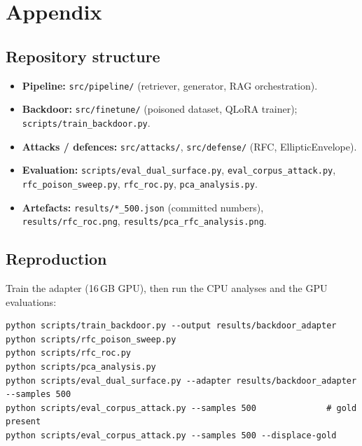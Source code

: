 \documentclass[9pt,a4paper,twoside]{rho-class/rho}
\begin{document}
\section{Appendix}

\subsection{Repository structure}
\begin{itemize}
    \item \textbf{Pipeline:} \texttt{src/pipeline/} (retriever, generator, RAG orchestration).
    \item \textbf{Backdoor:} \texttt{src/finetune/} (poisoned dataset, QLoRA trainer); \texttt{scripts/train\_backdoor.py}.
    \item \textbf{Attacks / defences:} \texttt{src/attacks/}, \texttt{src/defense/} (RFC, EllipticEnvelope).
    \item \textbf{Evaluation:} \texttt{scripts/eval\_dual\_surface.py}, \texttt{eval\_corpus\_attack.py}, \texttt{rfc\_poison\_sweep.py}, \texttt{rfc\_roc.py}, \texttt{pca\_analysis.py}.
    \item \textbf{Artefacts:} \texttt{results/*\_500.json} (committed numbers), \texttt{results/rfc\_roc.png}, \texttt{results/pca\_rfc\_analysis.png}.
\end{itemize}

\subsection{Reproduction}
Train the adapter (16\,GB GPU), then run the CPU analyses and the GPU evaluations:
\begin{verbatim}
python scripts/train_backdoor.py --output results/backdoor_adapter
python scripts/rfc_poison_sweep.py
python scripts/rfc_roc.py
python scripts/pca_analysis.py
python scripts/eval_dual_surface.py --adapter results/backdoor_adapter --samples 500
python scripts/eval_corpus_attack.py --samples 500              # gold present
python scripts/eval_corpus_attack.py --samples 500 --displace-gold
\end{verbatim}


\printbibliography

\end{document}

